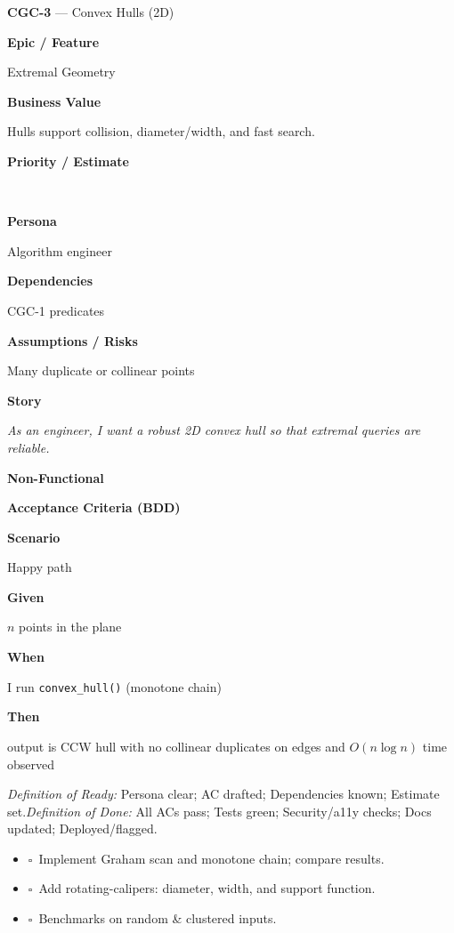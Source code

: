 \documentclass[11pt,a4paper]{article}
\newcommand{\MetaRow}[2]{%
  \noindent\begin{minipage}[t]{0.24\linewidth}\raggedleft\bfseries #1\end{minipage}%
  \hspace{0.8em}%
  \begin{minipage}[t]{0.72\linewidth}\raggedright #2\end{minipage}\par\vspace{0.3em}}
\newcommand{\CBox}{\(\square\)}
\newcommand{\BDDRow}[2]{\MetaRow{#1}{#2}}
\newenvironment{BDD}{\par\medskip}{\par\medskip}
\newcommand{\StoryTitle}[2]{\textbf{#1} --- #2}
\newcommand{\DoR}{\textit{Definition of Ready:} Persona clear; AC drafted; Dependencies known; Estimate set.}
\newcommand{\DoD}{\textit{Definition of Done:} All ACs pass; Tests green; Security/a11y checks; Docs updated; Deployed/flagged.}
\begin{document}
\begin{StoryCard}{\StoryTitle{CGC-3}{Convex Hulls (2D)}}
\MetaRow{Epic / Feature}{Extremal Geometry}
\MetaRow{Business Value}{Hulls support collision, diameter/width, and fast search.}
\MetaRow{Priority / Estimate}{\ \ \Badge{SP: 3}}
\MetaRow{Persona}{Algorithm engineer}
\MetaRow{Dependencies}{CGC-1 predicates}
\MetaRow{Assumptions / Risks}{Many duplicate or collinear points}
\MetaRow{Story}{\emph{As an engineer, I want a robust 2D convex hull so that extremal queries are reliable.}}

\medskip
\noindent\textbf{Non-Functional}\quad
{}\ \ 

\medskip
\noindent\textbf{Acceptance Criteria (BDD)}
\begin{BDD}
\BDDRow{Scenario}{Happy path}
\BDDRow{Given}{$n$ points in the plane}
\BDDRow{When}{I run \texttt{convex\_hull()} (monotone chain)}
\BDDRow{Then}{output is CCW hull with no collinear duplicates on edges and $O(n\log n)$ time observed}
\end{BDD}

\medskip
{\footnotesize \DoR\quad\textbullet\quad \DoD}
\end{StoryCard}

\begin{TaskBox}
\begin{itemize}
  \item \CBox\ Implement Graham scan and monotone chain; compare results.
  \item \CBox\ Add rotating-calipers: diameter, width, and support function.
  \item \CBox\ Benchmarks on random \& clustered inputs.
\end{itemize}
\end{TaskBox}

\clearpage
\end{document}
